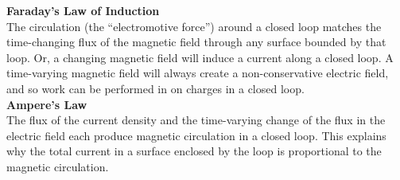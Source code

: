 \textbf{Faraday's Law of Induction} \\

The circulation (the “electromotive force”) around a closed loop matches the time-changing flux of the magnetic field through any surface bounded by that loop. Or, a changing magnetic field will induce a current along a closed loop. A time-varying magnetic field will always create a non-conservative electric field, and so work can be performed in on charges in a closed loop. \\

\textbf{Ampere's Law} \\

The flux of the current density and the time-varying change of the flux in the electric field each produce magnetic circulation in a closed loop. This explains why the total current in a surface enclosed by the loop is proportional to the magnetic circulation.



